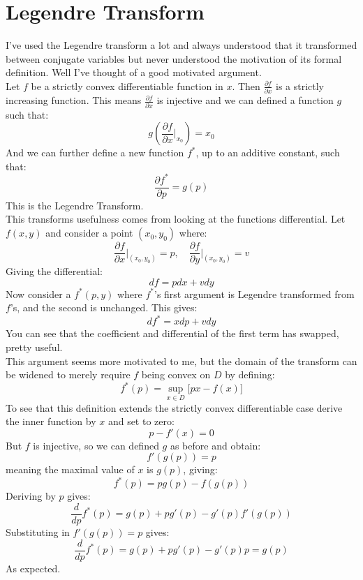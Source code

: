
\section{Legendre Transform}
I've used the Legendre transform a lot and always understood that it transformed between conjugate variables but never understood the motivation of its formal definition. 
Well I've thought of a good motivated argument.
\\

Let $f$ be a strictly convex differentiable function in $x$.
Then $\frac{\partial f}{\partial x}$ is a strictly increasing function.
This means $\frac{\partial f}{\partial x}$ is injective and we can defined a function $g$ such that:
\[g\left(\frac{\partial f}{\partial x}\bigg|_{x_0}\right) = x_0\]
And we can further define a new function $f^*$,
up to an additive constant,
such that:
\[\frac{\partial f^*}{\partial p} = g(p)\]
This is the Legendre Transform.
\\

This transforms usefulness comes from looking at the functions differential.
Let $f(x,y)$ and consider a point $(x_0,y_0)$ where:
\[\frac{\partial f}{\partial x}\bigg|_{(x_0,y_0)} = p,\quad\frac{\partial f}{\partial y}\bigg|_{(x_0,y_0)} = v \]
Giving the differential:
\[df = pdx+vdy\]
Now consider a $f^*(p,y)$ where $f^*$'s first argument is Legendre transformed from $f$'s, 
and the second is unchanged.
This gives:
\[df^* = xdp+vdy\]
You can see that the coefficient and differential of the first term has swapped,
pretty useful.
\\

This argument seems more motivated to me, 
but the domain of the transform can be widened to merely require $f$ being convex on $D$ by defining:
\[f^*(p) = \sup_{x\in D}\big[px-f(x)\big]\]
To see that this definition extends the strictly convex differentiable case derive the inner function by $x$ and set to zero:
\[p-f'(x)=0\]
But $f$ is injective,
so we can defined $g$ as before and obtain:
\[f'(g(p)) = p\]
meaning the maximal value of $x$ is $g(p)$, 
giving:
\[f^*(p) = pg(p)-f(g(p))\]
Deriving by $p$ gives:
\[\frac{d}{d p}f^*(p) = g(p)+pg'(p)-g'(p)f'(g(p))\]
Substituting in $f'(g(p)) = p$ gives:
\[\frac{d}{d p}f^*(p) = g(p)+pg'(p)-g'(p)p = g(p)\]
As expected.
